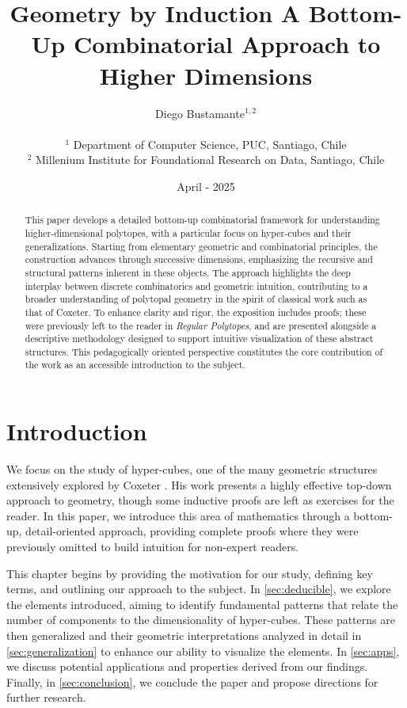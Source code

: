 \documentclass{article}
\title{Geometry by Induction A Bottom-Up Combinatorial Approach to Higher Dimensions}
\date{April - 2025}
\author{%
	Diego Bustamante$^{1,2}$\\ \\
	{$^1$ Department of Computer Science, PUC, Santiago, Chile}\\
	{$^2$ Millenium Institute for Foundational Research on Data, Santiago, Chile}\\
}
\begin{document}
	\setcounter{page}{1}
	
	\maketitle

	\begin{abstract}
		This paper develops a detailed bottom-up combinatorial framework for understanding higher-dimensional polytopes, with a particular focus on hyper-cubes and their generalizations. Starting from elementary geometric and combinatorial principles, the construction advances through successive dimensions, emphasizing the recursive and structural patterns inherent in these objects. The approach highlights the deep interplay between discrete combinatorics and geometric intuition, contributing to a broader understanding of polytopal geometry in the spirit of classical work such as that of Coxeter. To enhance clarity and rigor, the exposition includes proofs; these were previously left to the reader in \emph{Regular Polytopes}, and are presented alongside a descriptive methodology designed to support intuitive visualization of these abstract structures. This pedagogically oriented perspective constitutes the core contribution of the work as an accessible introduction to the subject.
	\end{abstract}

	\section{Introduction \label{sec:intro}}
	
	We focus on the study of hyper-cubes, one of the many geometric structures extensively explored by Coxeter \cite{coxeter1973regular}. His work presents a highly effective top-down approach to geometry, though some inductive proofs are left as exercises for the reader. In this paper, we introduce this area of mathematics through a bottom-up, detail-oriented approach, providing complete proofs where they were previously omitted to build intuition for non-expert readers.
	
	This chapter begins by providing the motivation for our study, defining key terms, and outlining our approach to the subject. In \autoref{sec:deducible}, we explore the elements introduced, aiming to identify fundamental patterns that relate the number of components to the dimensionality of hyper-cubes. These patterns are then generalized and their geometric interpretations analyzed in detail in \autoref{sec:generalization} to enhance our ability to visualize the elements. In \autoref{sec:apps}, we discuss potential applications and properties derived from our findings. Finally, in \autoref{sec:conclusion}, we conclude the paper and propose directions for further research.
		
\end{document}
